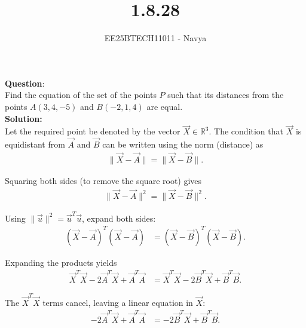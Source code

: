 \documentclass[journal]{IEEEtran}
\begin{document}

\vspace{3cm}

\title{1.8.28}
\author{EE25BTECH11011 - Navya}
{\let\newpage\relax\maketitle}

\renewcommand{\thefigure}{\theenumi}
\renewcommand{\thetable}{\theenumi}
\setlength{\intextsep}{10pt} %

\textbf{Question}:\\
Find the equation of the set of the points $P$ such that its distances 
from the points $A(3,4,-5)$ and $B(-2,1,4)$ are equal.\\

\textbf{Solution:} \\

Let the required point be denoted by the vector $\Vec{X}\in\mathbb{R}^3$.  
The condition that $\Vec{X}$ is equidistant from $\Vec{A}$ and $\Vec{B}$ can be written using the norm (distance) as
\begin{align}
\lVert \Vec{X} - \Vec{A} \rVert = \lVert \Vec{X} - \Vec{B} \rVert.
\end{align}

Squaring both sides (to remove the square root) gives
\begin{align}
\lVert \Vec{X} - \Vec{A} \rVert^2 = \lVert \Vec{X} - \Vec{B} \rVert^2.
\end{align}

Using $\lVert \Vec{u}\rVert^2 = \Vec{u}^T\Vec{u}$, expand both sides:
\begin{align}
(\Vec{X}-\Vec{A})^T(\Vec{X}-\Vec{A}) &= (\Vec{X}-\Vec{B})^T(\Vec{X}-\Vec{B}).
\end{align}

Expanding the products yields
\begin{align}
\Vec{X}^T\Vec{X} - 2\Vec{A}^T\Vec{X} + \Vec{A}^T\Vec{A}
&= \Vec{X}^T\Vec{X} - 2\Vec{B}^T\Vec{X} + \Vec{B}^T\Vec{B}.
\end{align}

The $\Vec{X}^T\Vec{X}$ terms cancel, leaving a linear equation in $\Vec{X}$:
\begin{align}
-2\Vec{A}^T\Vec{X} + \Vec{A}^T\Vec{A} &= -2\Vec{B}^T\Vec{X} + \Vec{B}^T\Vec{B}.
\end{align}
\end{document}
